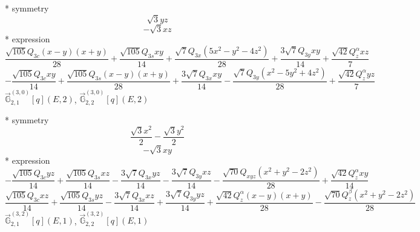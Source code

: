 \documentclass[fleqn,8pt]{jsarticle}
\begin{document}
\noindent\quad ** symmetry
\begin{dmath*}
\sqrt{3} y z
\end{dmath*}
\begin{dmath*}
- \sqrt{3} x z
\end{dmath*}
\noindent\quad ** expression
\begin{dmath*}
\frac{\sqrt{105} Q_{3c} \left(x - y\right) \left(x + y\right)}{28} + \frac{\sqrt{105} Q_{3s} x y}{14} + \frac{\sqrt{7} Q_{3x} \left(5 x^{2} - y^{2} - 4 z^{2}\right)}{28} + \frac{3 \sqrt{7} Q_{3y} x y}{14} + \frac{\sqrt{42} Q_{z}^{\alpha} x z}{7}
\end{dmath*}
\begin{dmath*}
- \frac{\sqrt{105} Q_{3c} x y}{14} + \frac{\sqrt{105} Q_{3s} \left(x - y\right) \left(x + y\right)}{28} + \frac{3 \sqrt{7} Q_{3x} x y}{14} - \frac{\sqrt{7} Q_{3y} \left(x^{2} - 5 y^{2} + 4 z^{2}\right)}{28} + \frac{\sqrt{42} Q_{z}^{\alpha} y z}{7}
\end{dmath*}
\noindent\quad $\vec{\mathbb{G}}_{2,1}^{(3,0)}[q](E,2)$, $\vec{\mathbb{G}}_{2,2}^{(3,0)}[q](E,2)$

\noindent\quad ** symmetry
\begin{dmath*}
\frac{\sqrt{3} x^{2}}{2} - \frac{\sqrt{3} y^{2}}{2}
\end{dmath*}
\begin{dmath*}
- \sqrt{3} x y
\end{dmath*}
\noindent\quad ** expression
\begin{dmath*}
- \frac{\sqrt{105} Q_{3c} y z}{14} + \frac{\sqrt{105} Q_{3s} x z}{14} - \frac{3 \sqrt{7} Q_{3x} y z}{14} - \frac{3 \sqrt{7} Q_{3y} x z}{14} - \frac{\sqrt{70} Q_{xyz} \left(x^{2} + y^{2} - 2 z^{2}\right)}{28} + \frac{\sqrt{42} Q_{z}^{\alpha} x y}{14}
\end{dmath*}
\begin{dmath*}
\frac{\sqrt{105} Q_{3c} x z}{14} + \frac{\sqrt{105} Q_{3s} y z}{14} - \frac{3 \sqrt{7} Q_{3x} x z}{14} + \frac{3 \sqrt{7} Q_{3y} y z}{14} + \frac{\sqrt{42} Q_{z}^{\alpha} \left(x - y\right) \left(x + y\right)}{28} - \frac{\sqrt{70} Q_{z}^{\beta} \left(x^{2} + y^{2} - 2 z^{2}\right)}{28}
\end{dmath*}
\noindent\quad $\vec{\mathbb{G}}_{2,1}^{(3,2)}[q](E,1)$, $\vec{\mathbb{G}}_{2,2}^{(3,2)}[q](E,1)$
\end{document}
